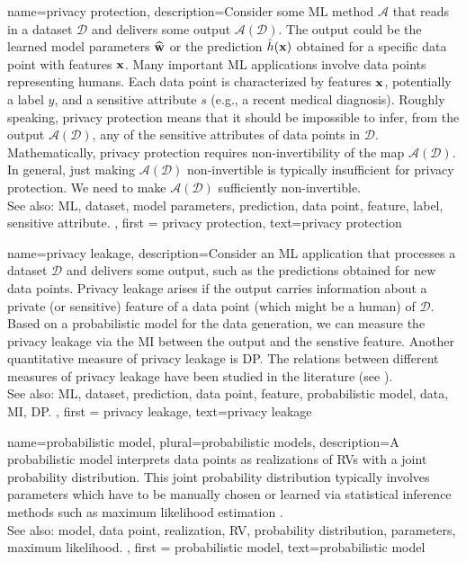 {name={privacy protection},
     description={Consider some ML method $\mathcal{A}$ that reads 
	 in a dataset $\mathcal{D}$ and delivers some output $\mathcal{A}(\mathcal{D})$. The output 
	 could be the learned model parameters $\widehat{{\bf w}}$ or the prediction 
	 $\hat{h}({\bf x})$ obtained for a specific data point with features 
	 ${\bf x}$. Many important ML applications involve data points 
		representing humans. Each data point is characterized by features ${\bf x}$, 
		potentially a label $y$, and a sensitive attribute $s$ (e.g., a recent medical diagnosis). 
		Roughly speaking, privacy protection means that it should be impossible to infer, from the output $\mathcal{A}(\mathcal{D})$, 
		any of the sensitive attributes of data points in $\mathcal{D}$. Mathematically, privacy protection requires non-invertibility 
		of the map $\mathcal{A}(\mathcal{D})$. In general, just making $\mathcal{A}(\mathcal{D})$ non-invertible 
		is typically insufficient for privacy protection. We need to make $\mathcal{A}(\mathcal{D})$ sufficiently non-invertible. 
					\\ 
		See also: ML, dataset, model parameters, prediction, data point, feature, label, sensitive attribute.
	}, 
	first = {privacy protection}, text={privacy protection} 
}

{
	name={privacy leakage},
	description={Consider an ML application that processes a 
	dataset $\mathcal{D}$ and delivers some output, such as the predictions 
	obtained for new data points. Privacy leakage arises 
	if the output carries information about a private (or sensitive) feature of 
	a data point (which might be a human) of $\mathcal{D}$. Based on a probabilistic model 
	for the data generation, we can measure the privacy leakage via the MI 
	between the output and the senstive feature. Another quantitative measure of privacy leakage 
	is DP. The relations between different measures of privacy leakage have been 
	studied in the literature (see \cite{InfThDiffPriv}). 
				\\ 
		See also: ML, dataset, prediction, data point, feature, probabilistic model, data, MI, DP. 
	}, 
	first = {privacy leakage}, text={privacy leakage} 
}



{
	name={probabilistic model}, plural={probabilistic models},
	description={A probabilistic model interprets data points 
		as realizations of RVs with a joint probability distribution. This joint probability distribution typically 
		involves parameters which have to be manually chosen or learned via statistical inference 
		methods such as maximum likelihood estimation \cite{LC}.
					\\ 
		See also: model, data point, realization, RV, probability distribution, parameters, maximum likelihood. }, 
	first = {probabilistic model}, text={probabilistic model} 
}



